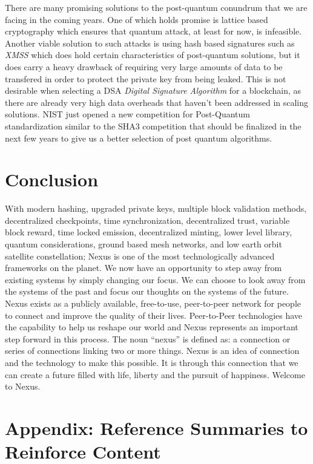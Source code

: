\documentclass[11pt]{article}
\begin{document}
There are many promising solutions to the post-quantum conundrum that we are facing in the coming years. 
One of which holds promise is lattice based cryptography which ensures that quantum attack, at least for now, is infeasible. 
Another viable solution to such attacks is using hash based signatures such as \textit{XMSS} which does hold certain characteristics of post-quantum solutions, but it does carry a heavy drawback of requiring very large amounts of data to be transfered in order to protect the private key from being leaked. 
This is not desirable when selecting a DSA \textit{Digital Signature Algorithm} for a blockchain, as there are already very high data overheads that haven't been addressed in scaling solutions.
NIST just opened a new competition for Post-Quantum standardization similar to the SHA3 competition that should be finalized in the next few years to give us a better selection of post quantum algorithms. \cite{NIST_POST_QUANTUM} 

\section{Conclusion}

With modern hashing, upgraded private keys, multiple block validation methods, decentralized checkpoints, time synchronization, decentralized trust, variable block reward, time locked emission, decentralized minting, lower level library, quantum considerations, ground based mesh networks, and low earth orbit satellite constellation; Nexus is one of the most technologically advanced frameworks on the planet. 
We now have an opportunity to step away from existing systems by simply changing our focus. 
We can choose to look away from the systems of the past and focus our thoughts on the systems of the future. 
Nexus exists as a publicly available, free-to-use, peer-to-peer network for people to connect and improve the quality of their lives.  
Peer-to-Peer technologies have the capability to help us reshape our world and Nexus represents an important step forward in this process. 
The noun ``nexus'' is defined as: a connection or series of connections linking two or more things. 
Nexus is an idea of connection and the technology to make this possible.
It is through this connection that we can create a future filled with life, liberty and the pursuit of happiness.
Welcome to Nexus.
\pagebreak

\appendix

\section{Appendix: Reference Summaries to Reinforce Content}
\end{document}
